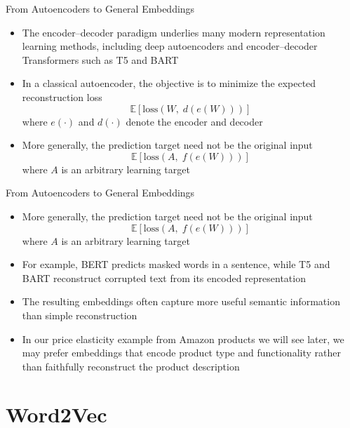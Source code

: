 \documentclass[aspectratio=1610,12pt,xcolor=dvipsnames]{beamer}
\begin{document}
\begin{frame}{From Autoencoders to General Embeddings}

\begin{itemize}
    \item The encoder--decoder paradigm underlies many modern representation learning methods, including deep autoencoders and encoder--decoder Transformers such as T5 and BART
    
    \item In a classical autoencoder, the objective is to minimize the expected reconstruction loss
    \[
        \mathbb{E}\!\left[\mathrm{loss}\!\left(W,\; d(e(W))\right)\right]
    \]
    where $e(\cdot)$ and $d(\cdot)$ denote the encoder and decoder

    \item More generally, the prediction target need not be the original input
    \[
        \mathbb{E}\!\left[\mathrm{loss}\!\left(A,\; f(e(W))\right)\right]
    \]
    where $A$ is an arbitrary learning target
\end{itemize}
\end{frame}

\begin{frame}{From Autoencoders to General Embeddings}

\begin{itemize}
    \item More generally, the prediction target need not be the original input
        \[
            \mathbb{E}\!\left[\mathrm{loss}\!\left(A,\; f(e(W))\right)\right]
        \]
        where $A$ is an arbitrary learning target
    \item For example, BERT predicts masked words in a sentence, while T5 and BART reconstruct corrupted text from its encoded representation

    \item The resulting embeddings often capture more useful semantic information than simple reconstruction

    \item In our price elasticity example from Amazon products we will see later, we may prefer embeddings that encode product type and functionality rather than faithfully reconstruct the product description
\end{itemize}
    
\end{frame}

\section{Word2Vec}
\end{document}
